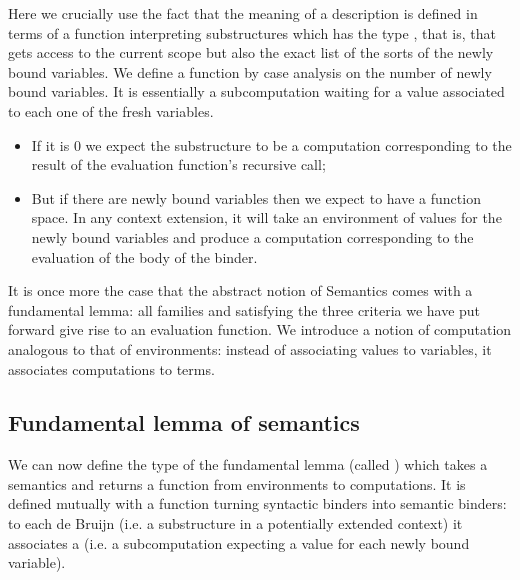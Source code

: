 \begin{agdasnippet}
\end{agdasnippet}

Here we crucially use the fact that the meaning of a description is
defined in terms of a function interpreting substructures which has
the type    , that is, that gets access
to the current scope but also the exact list of the sorts of the newly bound variables.
We define a function  by case analysis on the number of newly bound
variables. It is essentially a subcomputation waiting for a value associated to
each one of the fresh variables.
\begin{itemize}
\item If it is $0$ we expect the substructure to be a computation corresponding
    to the result of the evaluation function's recursive call;
  \item But if there are newly bound variables then we expect to have a function
    space. In any context extension, it will take an environment of values for
    the newly bound variables and produce a computation corresponding to the
    evaluation of the body of the binder.
\end{itemize}

\begin{agdasnippet}
\end{agdasnippet}

It is once more the case that the abstract notion of Semantics comes
with a fundamental lemma: all   families  and
 satisfying the three criteria we have put forward give rise
to an evaluation function. We introduce a notion of computation
 analogous to that of environments: instead of associating
values to variables, it associates computations to terms.

\begin{agdasnippet}
\end{agdasnippet}

\subsection{Fundamental lemma of semantics}\label{sec:fundamentallemma}

We can now define the type of the fundamental lemma (called \semfun{}) which
takes a semantics and returns a function from environments to computations.
It is defined mutually with a
function  turning syntactic binders into semantic binders: to
each de Bruijn  (i.e. a substructure in a potentially extended
context) it associates a  (i.e. a subcomputation expecting a
value for each newly bound variable).

